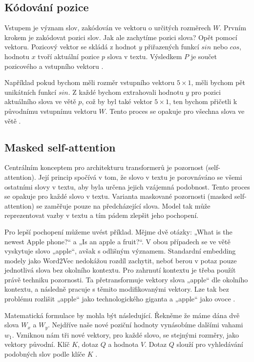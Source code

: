 \documentclass[FM,DP]{tulthesis}
\begin{document}
		\subsection{Kódování pozice}
		Vstupem je význam slov, zakódován ve vektoru o určitých rozměrech $W$. Prvním krokem je zakódovat pozici slov. Jak ale zachytíme pozici slova? Opět pomocí vektoru. Pozicový vektor se skládá z hodnot $y$ přiřazených funkcí $sin$ nebo $cos$, hodnotu $x$ tvoří aktuální pozice $p$ slova v textu. Výsledkem $P$ je součet pozicového a vstupního vektoru \cite{rothman2021transformers}.
		
		Například pokud bychom měli rozměr vstupního vektoru $5 \times 1$, měli bychom pět unikátních funkcí $sin$. Z každé bychom extrahovali hodnotu $y$ pro pozici aktuálního slova ve větě $p$, což by byl také vektor $5 \times 1$, ten bychom přičetli k původnímu vstupnímu vektoru $W$. Tento proces se opakuje pro všechna slova ve větě \cite{rothman2021transformers}. 
		
		\subsection{Masked self-attention}
		Centrálním konceptem pro architekturu transformerů je pozornost (self-attention). Její princip spočívá v tom, že slovo v textu je porovnáváno se všemi ostatními slovy v textu, aby byla určena jejich vzájemná podobnost. Tento proces se opakuje pro každé slovo v textu. Varianta maskované pozornosti (masked self-attention) se zaměřuje pouze na předcházející slova. Model tak může reprezentovat vazby v textu a tím pádem zlepšit jeho pochopení.
		
		Pro lepší pochopení můžeme uvést příklad. Mějme dvě otázky: „What is the newest Apple phone?“ a „Is an apple a fruit?“.  V obou případech se ve větě vyskytuje slovo „apple“, avšak s odlišným významem. Standardní embedding modely jako Word2Vec nedokážou rozdíl zachytit, neboť berou v potaz pouze jednotlivá slova bez okolního kontextu. Pro zahrnutí kontextu je třeba použít právě techniku pozornosti. Ta přetransformuje vektory slova „apple“ dle okolního kontextu, a následně pracuje s těmito modifikovanými vektory. Lze tak bez problému rozlišit „apple“ jako technologického giganta a „apple“ jako ovoce \cite{vaswani2023attention}.
		
		Matematická formulace by mohla být následující. Řekněme že máme dána dvě slova $W_x$ a $W_y$. Nejdříve naše nové poziční hodnoty vynásobíme dalšími vahami $w_1$. Vzniknou nám tři nové vektory, pro každé slovo, se stejnými rozměry, jako vektory původní. Klíč $K$, dotaz $Q$ a hodnota $V$. Dotaz $Q$ slouží pro vyhledávání podobných slov podle klíče $K$ \cite{vaswani2023attention} \cite{rothman2021transformers}. 
		
\end{document}
